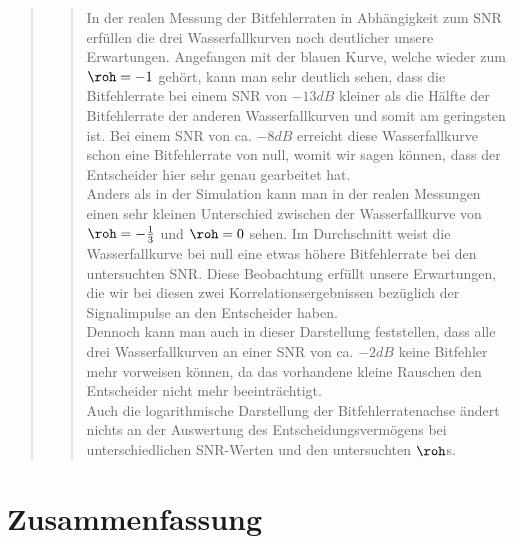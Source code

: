 \begin{quote}
\begin{quote}
                \vspace{2em}
        
        In der realen Messung der Bitfehlerraten in Abhängigkeit zum SNR
        erfüllen die drei Wasserfallkurven noch deutlicher unsere Erwartungen.
        Angefangen mit der blauen Kurve, welche wieder zum $\roh = -1$ gehört,
        kann man sehr deutlich sehen, dass die Bitfehlerrate bei einem
        SNR von $-13 dB$ kleiner als die Hälfte der Bitfehlerrate der anderen
        Wasserfallkurven und somit am geringsten ist. Bei einem SNR von ca. $-8
        dB$ erreicht diese Wasserfallkurve schon eine Bitfehlerrate von null,
        womit wir sagen können, dass der Entscheider hier sehr genau gearbeitet
        hat.\\ 
        Anders als in der Simulation kann man in der realen Messungen einen sehr
        kleinen Unterschied zwischen der Wasserfallkurve von $\roh =
        -\frac{1}{3}$ und $\roh = 0$ sehen. Im Durchschnitt weist die
        Wasserfallkurve bei null eine etwas höhere Bitfehlerrate bei den
        untersuchten SNR. Diese Beobachtung erfüllt unsere Erwartungen, die wir
        bei diesen zwei Korrelationsergebnissen bezüglich der Signalimpulse an den 
        Entscheider haben.\\
        Dennoch kann man auch in dieser Darstellung feststellen, dass alle drei
        Wasserfallkurven an einer SNR von ca. $-2 dB$ keine Bitfehler mehr
        vorweisen können, da das vorhandene kleine Rauschen den Entscheider
        nicht mehr beeinträchtigt.\\
        
        Auch die logarithmische Darstellung der Bitfehlerratenachse ändert
        nichts an der Auswertung des Entscheidungsvermögens bei
        unterschiedlichen SNR-Werten und den untersuchten $\roh$s.
        
        
        
    \end{quote}  %
            
\end{quote}%

    
\section{Zusammenfassung}
\begin{quote}

    
\end{quote}%
         


